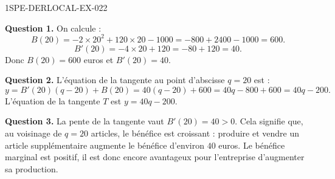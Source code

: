 \begin{corrige}{1SPE-DERLOCAL-EX-022}

\textbf{Question 1.} On calcule :
\[
B(20) = -2 \times 20^2 + 120 \times 20 - 1000 = -800 + 2400 - 1000 = 600.
\]
\[
B'(20) = -4 \times 20 + 120 = -80 + 120 = 40.
\]
Donc $\boxed{B(20) = 600}$ euros et $\boxed{B'(20) = 40}$.

\textbf{Question 2.} L'équation de la tangente au point d'abscisse $q = 20$ est :
\[
y = B'(20)(q - 20) + B(20) = 40(q - 20) + 600 = 40q - 800 + 600 = 40q - 200.
\]
L'équation de la tangente $T$ est $\boxed{y = 40q - 200}$.

\textbf{Question 3.} La pente de la tangente vaut $B'(20) = 40 > 0$. Cela signifie que, au voisinage de $q = 20$ articles, le bénéfice est croissant : produire et vendre un article supplémentaire augmente le bénéfice d'environ $40$ euros. Le bénéfice marginal est positif, il est donc encore avantageux pour l'entreprise d'augmenter sa production.

\end{corrige}
